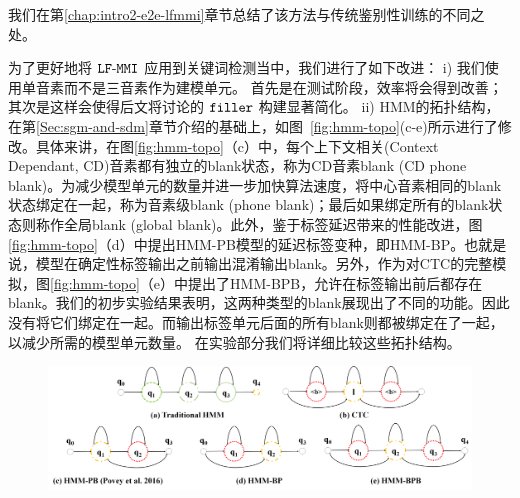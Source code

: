 我们在第\ref{chap:intro2-e2e-lfmmi}章节总结了该方法与传统鉴别性训练的不同之处。



为了更好地将 $\tt{LF\text{-}MMI}$ 应用到关键词检测当中，我们进行了如下改进：
i) 我们使用单音素而不是三音素作为建模单元。
首先是在测试阶段，效率将会得到改善；其次是这样会使得后文将讨论的 $\tt filler$ 构建显著简化。
ii) HMM的拓扑结构，在第\ref{Sec:sgm-and-sdm}章节介绍的基础上，如图~\ref{fig:hmm-topo}(c-e)所示进行了修改。具体来讲，在图\ref{fig:hmm-topo}（c）中，每个上下文相关(Context Dependant, CD)音素都有独立的blank状态，称为CD音素blank (CD phone blank)。为减少模型单元的数量并进一步加快算法速度，将中心音素相同的blank状态绑定在一起，称为音素级blank (phone blank)；最后如果绑定所有的blank状态则称作全局blank (global blank)。此外，鉴于标签延迟带来的性能改进\cite{amodei2015deep}，图\ref{fig:hmm-topo}（d）中提出HMM-PB模型的延迟标签变种，即HMM-BP。也就是说，模型在确定性标签输出之前输出混淆输出blank。另外，作为对CTC的完整模拟，图\ref{fig:hmm-topo}（e）中提出了HMM-BPB，允许在标签输出前后都存在blank。我们的初步实验结果表明，这两种类型的blank展现出了不同的功能。因此没有将它们绑定在一起。而输出标签单元后面的所有blank则都被绑定在了一起，以减少所需的模型单元数量。
在实验部分我们将详细比较这些拓扑结构。



\begin{figure}[!htp]
  \centering
    \captionstyle{\centering}
    \includegraphics[width=\textwidth]{figure/hmm-topo.png}
\end{figure}

